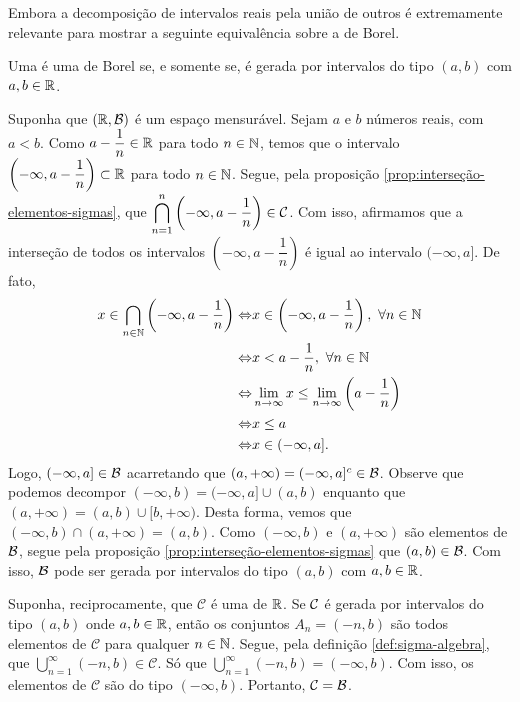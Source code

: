 Embora a decomposição de intervalos reais pela união de outros é extremamente relevante para mostrar a seguinte equivalência sobre a \sigal de Borel.\\
\begin{theorem}
\label{teo:equiv-borel}
    Uma \sigal é uma de Borel  se, e somente se, é gerada por intervalos do tipo $(a,b)$ com $a,b \in \mathbb{R}$.
\end{theorem}

\begin{prova}
   Suponha que $(\mathbb{R},\operatorname{\mathcal{B}})$ é um espaço mensurável. 
   Sejam $a$ e $b$ números reais, com $a<b$.
   Como $a - \dfrac{1}{n} \in \mathbb{R}$ para todo $n \in \operatorname{\mathbb{N}}$, temos que o intervalo
   $\left(-\infty, a- \dfrac{1}{n}\right) \subset \mathbb{R}$ para todo $n \in \operatorname{\mathbb{N}}$.
   Segue, pela proposição \ref{prop:interseção-elementos-sigmas}, que
   $\displaystyle \bigcap_{n = 1}^n \left(-\infty, a- \dfrac{1}{n}\right) \in \operatorname{\mathcal{C}}$.
   Com isso, afirmamos que a interseção de todos os intervalos $\left(-\infty, a - \dfrac{1}{n}\right)$ é igual ao intervalo $(-\infty, a]$.
   De fato,
   \begin{align*}
   		x \in \bigcap_{n \in \operatorname{\mathbb{N}}} \left(-\infty, a - \dfrac{1}{n}\right)
   		\Leftrightarrow & x \in \left(-\infty, a - \dfrac{1}{n}\right), \ \forall n \in \operatorname{\mathbb{N}}\\
   		\Leftrightarrow & x < a - \dfrac{1}{n}, \ \forall n \in \operatorname{\mathbb{N}}\\
   		\Leftrightarrow & \displaystyle \lim_{n \to \infty} x \leq \displaystyle \lim_{n \to \infty} \left(a - \dfrac{1}{n}\right)\\
   		\Leftrightarrow & x \leq a\\
   		\Leftrightarrow & x \in (-\infty, a].
   \end{align*}
	Logo, $(-\infty, a] \in \operatorname{\mathcal{B}}$ acarretando que $(a, +\infty) = (-\infty, a]^c \in \operatorname{\mathcal{B}}$.
	Observe que podemos decompor $(-\infty, b) = (-\infty,a] \cup (a, b)$ enquanto que $(a, +\infty) = (a, b) \cup [b, +\infty)$.
	Desta forma, vemos que $(-\infty, b) \cap (a, +\infty) = (a,b)$. 
	Como $(-\infty, b)$ e $(a, +\infty)$ são elementos de $\operatorname{\mathcal{B}}$, segue pela proposição
	\ref{prop:interseção-elementos-sigmas} que $(a,b) \in \operatorname{\mathcal{B}}$.
	Com isso, $\operatorname{\mathcal{B}}$ pode ser gerada por intervalos do tipo $(a,b)$ com $a,b \in \mathbb{R}$.
   
	Suponha, reciprocamente, que $\mathcal{C}$ é uma \sigal de $\mathbb{R}$.
	Se $\operatorname{\mathcal{C}}$ é gerada por intervalos do tipo $(a,b)$ onde $a,b \in \mathbb{R}$, então
	os conjuntos $A_n = (-n, b)$ são todos elementos de $\mathcal{C}$ para qualquer $n \in \operatorname{\mathbb{N}}$.
	Segue, pela definição \ref{def:sigma-algebra}, que 
	$\displaystyle \bigcup_{n = 1}^\infty (-n,b) \in \mathcal{C}$.
	Só que $\displaystyle \bigcup_{n = 1}^\infty (-n,b) = (-\infty, b)$.
	Com isso, os elementos de $\mathcal{C}$ são do tipo $(-\infty, b)$.
	Portanto, $\mathcal{C} = \operatorname{\mathcal{B}}$.

\end{prova}

